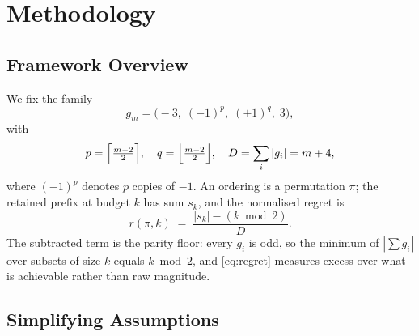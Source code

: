 \section{Methodology}
\label{sec:setting}

\subsection{Framework Overview}

We fix the family
\begin{equation}
g_{m}=\bigl(-3,\;(-1)^{p},\;(+1)^{q},\;3\bigr),
\label{eq:family}
\end{equation}
with
\begin{equation}
p=\Bigl\lceil\tfrac{m-2}{2}\Bigr\rceil,\quad
q=\Bigl\lfloor\tfrac{m-2}{2}\Bigr\rfloor,\quad
D=\sum_{i}|g_{i}|=m+4 ,
\label{eq:familyparams}
\end{equation}
where $(-1)^{p}$ denotes $p$ copies of $-1$. An ordering is a permutation $\pi$; the retained
prefix at budget $k$ has sum $s_{k}$, and the normalised regret is
\begin{equation}
r(\pi,k)\;=\;\frac{|s_{k}|-(k \bmod 2)}{D}.
\label{eq:regret}
\end{equation}
The subtracted term is the parity floor: every $g_{i}$ is odd, so the minimum of
$|\sum g_{i}|$ over subsets of size $k$ equals $k\bmod2$, and \eqref{eq:regret} measures
excess over what is achievable rather than raw magnitude.

\subsection{Simplifying Assumptions}

